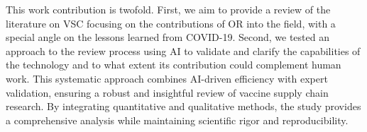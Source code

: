 \documentclass[journal,onecolumn]{IEEEtran}
\begin{document}
This work contribution is twofold. First, we aim to provide a review of the literature on VSC focusing on the contributions of OR into the field, with a special angle on the lessons learned from COVID-19. Second, we tested an approach to the review process using AI to validate and clarify the capabilities of the technology and to what extent its contribution could complement human work. This systematic approach combines AI-driven efficiency with expert validation, ensuring a robust and insightful review of vaccine supply chain research. By integrating quantitative and qualitative methods, the study provides a comprehensive analysis while maintaining scientific rigor and reproducibility.



\ifCLASSOPTIONcaptionsoff
  \newpage
\fi



\end{document}
